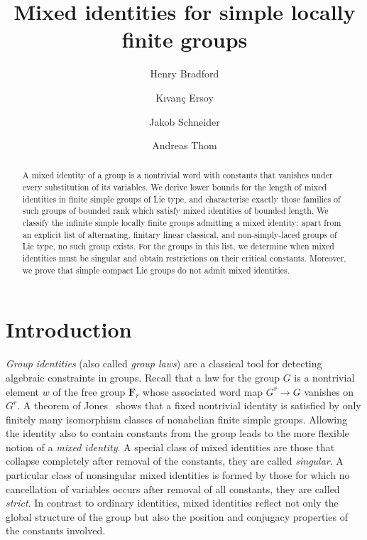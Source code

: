 \documentclass[a4paper,12pt]{amsproc}
\title{Mixed identities for simple locally finite groups}
\author[H. Bradford]{Henry Bradford}
\author[K. Ersoy]{Kıvanç Ersoy}
\author[J. Schneider]{Jakob Schneider}
\author[A. Thom]{Andreas Thom}
\theoremstyle{plain}
\theoremstyle{definition}
\begin{document}
\begin{abstract}
A mixed identity of a group is a nontrivial word with constants that
vanishes under every substitution of its variables. 
We derive lower bounds for the length of mixed identities in finite simple groups of Lie type, and characterise exactly those families of such groups of bounded rank 
which satisfy mixed identities of bounded length. We classify the infinite simple locally finite groups admitting a mixed identity: apart from an explicit list of alternating, finitary linear classical, and non-simply-laced groups of Lie type, no such group exists. For the groups in this list, we determine when mixed identities must be singular and obtain restrictions on their critical constants. Moreover, we prove that simple compact Lie groups do not admit mixed identities.
\end{abstract}
\maketitle

\tableofcontents
	
\section{Introduction}

\emph{Group identities} (also called \emph{group laws}) are a classical tool for detecting algebraic constraints in groups. Recall that a law for the group $G$ is a nontrivial element $w$ 
of the free group $\mathbf{F}_r$ whose associated word map $G^r\rightarrow G$ 
vanishes on $G^r$. A theorem of Jones~\cite{jones1974varieties} shows that a fixed nontrivial identity is
satisfied by only finitely many isomorphism classes of nonabelian finite
simple groups. Allowing the identity also to contain constants from the group leads to the more flexible
notion of a \emph{mixed identity}. A special class of mixed identities are those that collapse completely after removal of the constants, they are called \emph{singular}. A particular class of nonsingular mixed identities is formed by those for which no cancellation of variables occurs after removal of all constants, they are called \emph{strict}.
In contrast to ordinary identities, mixed
identities reflect not only the global structure of the group but also the
position and conjugacy properties of the constants involved.
\end{document}
